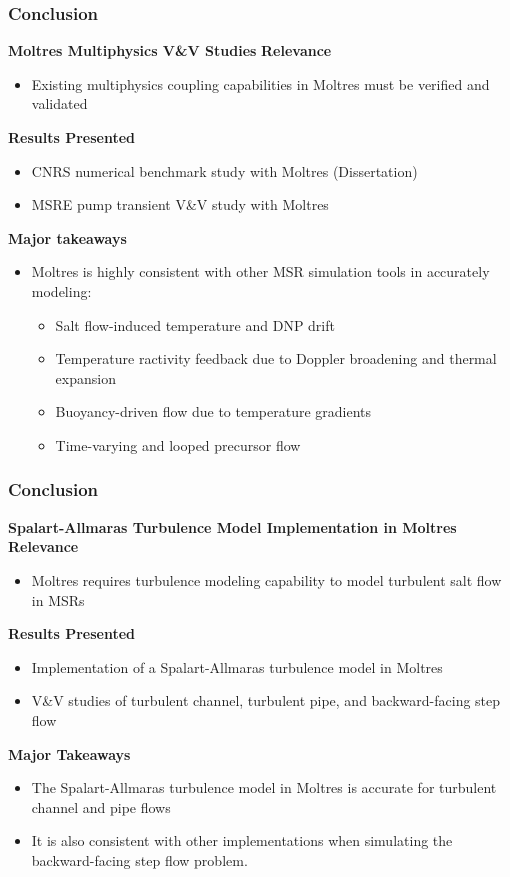 \begin{frame}
  \frametitle{Conclusion}
  \begin{block}{\textbf{Moltres Multiphysics V\&V Studies}}
    \textbf{Relevance}
    \begin{itemize}
      \item Existing multiphysics coupling capabilities in Moltres must be verified and validated
    \end{itemize}
    \textbf{Results Presented}
    \begin{itemize}
      \item CNRS numerical benchmark study with Moltres (Dissertation)
      \item MSRE pump transient V\&V study with Moltres
    \end{itemize}
    \textbf{Major takeaways}
    \begin{itemize}
      \item Moltres is highly consistent with other MSR simulation tools in accurately modeling:
      \begin{itemize}
        \item Salt flow-induced temperature and DNP drift
        \item Temperature ractivity feedback due to Doppler broadening and thermal expansion
        \item Buoyancy-driven flow due to temperature gradients
        \item Time-varying and looped precursor flow
      \end{itemize}
    \end{itemize}
  \end{block}
\end{frame}

\begin{frame}
  \frametitle{Conclusion}
  \begin{block}{\textbf{Spalart-Allmaras Turbulence Model Implementation in Moltres}}
    \textbf{Relevance}
    \begin{itemize}
      \item Moltres requires turbulence modeling capability to model turbulent salt
        flow in MSRs
    \end{itemize}
    \textbf{Results Presented}
    \begin{itemize}
      \item Implementation of a Spalart-Allmaras turbulence model in Moltres
      \item V\&V studies of turbulent channel, turbulent pipe, and backward-facing step flow
    \end{itemize}
    \textbf{Major Takeaways}
    \begin{itemize}
      \item The Spalart-Allmaras turbulence model in Moltres is accurate for turbulent channel and
        pipe flows
      \item It is also consistent with other implementations when simulating the
        backward-facing step flow problem.
    \end{itemize}
  \end{block}
\end{frame}

